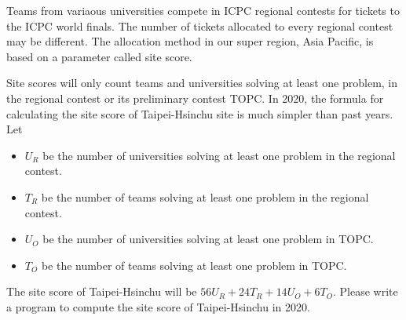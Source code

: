 Teams from variaous universities compete in ICPC regional contests for tickets 
to the ICPC world finals. The number of tickets allocated to every regional
contest may be different. The allocation method in our super region,
Asia Pacific, is based on a parameter called site score.

Site scores will only count teams and universities solving at least one problem,
in the regional contest or its preliminary contest TOPC.
In 2020, the formula for calculating the site score of Taipei-Hsinchu site
is much simpler than past years. Let
\begin{itemize}
\tightlist
\item $U_R$ be the number of universities solving at least one problem in 
the regional contest.
\item $T_R$ be the number of teams solving at least one problem in the regional
contest.
\item $U_O$ be the number of universities solving at least one problem in
TOPC. 
\item $T_O$ be the number of teams solving at least one problem in TOPC. 
\end{itemize}
The site score of Taipei-Hsinchu will be $56U_R+24T_R+14U_O+6T_O$. 
Please write a program to compute the site score of Taipei-Hsinchu in 2020.
